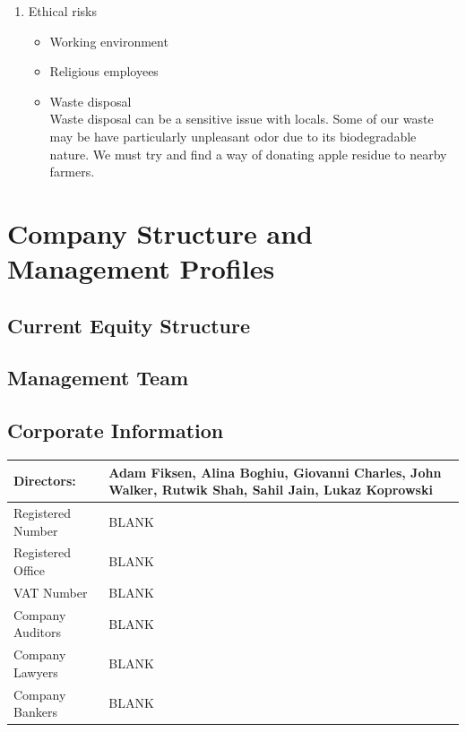 \documentclass[11pt]{article}
\begin{document}
\begin{enumerate}
  \item Ethical risks
    \begin{itemize}
    \item Working environment
    \item Religious employees
    \item Waste disposal \\
Waste disposal can be a sensitive issue with locals. Some of our waste may be have particularly unpleasant odor due to its biodegradable nature. We must try and find a way of donating apple residue to nearby farmers.
    \end{itemize}
  \end{enumerate}

\newpage
\section{Company Structure and Management Profiles}
  \subsection{Current Equity Structure}
  \subsection{Management Team}
  \subsection{Corporate Information}
  \begin{table}[H]
  \begin{center}
  \begin{tabular}{| p{7cm} | p{7cm} |}
  \hline
  Directors:  & Adam Fiksen, \newline Alina Boghiu, \newline Giovanni Charles, \newline John Walker, \newline Rutwik Shah, \newline Sahil Jain, \newline Lukaz Koprowski  \\
  \hline
  Registered Number & BLANK \\
  \hline
  Registered Office & BLANK \\
  \hline
  VAT Number        & BLANK \\
  \hline
  Company Auditors  & BLANK \\
  \hline
  Company Lawyers   & BLANK \\
  \hline
  Company Bankers   & BLANK \\
  \hline
  \end{tabular}
  \end{center}
  \end{table}
\end{document}
